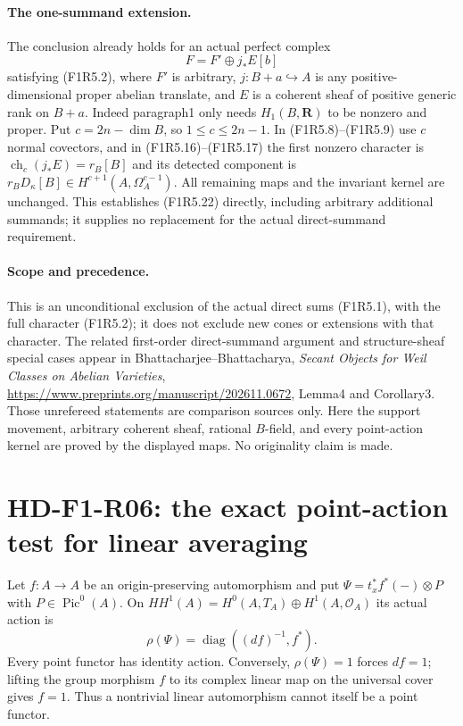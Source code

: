 \paragraph{The one-summand extension.}
The conclusion already holds for an actual perfect complex
\[
 F=F'\oplus j_*E[b]
 \tag{F1R5.22}
\]
satisfying (F1R5.2), where $F'$ is arbitrary, $j:B+a\hookrightarrow A$
is any positive-dimensional proper abelian translate, and
$E$ is a coherent sheaf of positive generic rank on $B+a$.
Indeed paragraph1 only needs $H_1(B,\mathbf R)$ to be nonzero
and proper. Put $c=2n-\dim B$, so $1\le c\le2n-1$.
In (F1R5.8)--(F1R5.9) use $c$ normal covectors, and in
(F1R5.16)--(F1R5.17) the first nonzero character is
$\operatorname{ch}_c(j_*E)=r_B[B]$ and its detected component
is $r_BD_\kappa[B]\in H^{c+1}(A,\Omega_A^{c-1})$.
All remaining maps and the invariant kernel are unchanged.
This establishes (F1R5.22) directly, including arbitrary
additional summands; it supplies no replacement for the
actual direct-summand requirement.

\paragraph{Scope and precedence.}
This is an unconditional exclusion of the actual direct sums
(F1R5.1), with the full character (F1R5.2); it does not exclude
new cones or extensions with that character. The related
first-order direct-summand argument and structure-sheaf special
cases appear in Bhattacharjee--Bhattacharya,
\emph{Secant Objects for Weil Classes on Abelian Varieties},
\url{https://www.preprints.org/manuscript/202611.0672},
Lemma4 and Corollary3. Those unrefereed statements are comparison
sources only. Here the support movement, arbitrary coherent
sheaf, rational $B$-field, and every point-action kernel are
proved by the displayed maps. No originality claim is made.

\section{HD-F1-R06: the exact point-action test for linear averaging}

Let $f:A\to A$ be an origin-preserving automorphism and put
$\Psi=t_x^*f^*(-)\otimes P$ with $P\in\operatorname{Pic}^0(A)$.
On $HH^1(A)=H^0(A,T_A)\oplus H^1(A,\mathcal O_A)$ its
actual action is
\[
          \rho(\Psi)=\operatorname{diag}((df)^{-1},f^*).
 \tag{F1R6.1}
\]
Every point functor has identity action. Conversely,
$\rho(\Psi)=1$ forces $df=1$; lifting the group morphism
$f$ to its complex linear map on the universal cover gives
$f=1$. Thus a nontrivial linear automorphism cannot itself
be a point functor.

